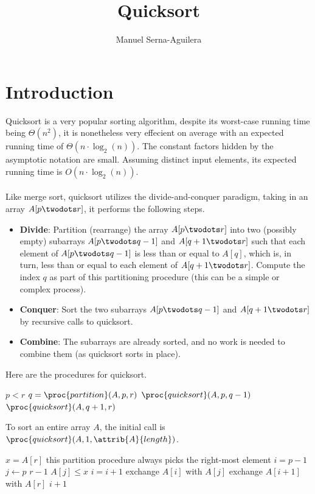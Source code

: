 \documentclass{article}
\title{Quicksort}
\author{Manuel Serna-Aguilera}
\date{}
\begin{document}
\maketitle

\section*{Introduction}
Quicksort is a very popular sorting algorithm, despite its worst-case running time being $\Theta{(n^2)}$, it is nonetheless very effecient on average with an expected running time of $\Theta{(n \cdot \log_2(n))}$. The constant factors hidden by the asymptotic notation are small. Assuming distinct input elements, its expected running time is $O{(n \cdot \log_2(n))}$.
\\ \\
Like merge sort, quicksort utilizes the divide-and-conquer paradigm, taking in an array $A[p \twodots r]$, it performs the following steps.
\begin{itemize}
    \item[] \textbf{Divide}: Partition (rearrange) the array $A[p \twodots r]$ into two (possibly empty) subarrays $A[p \twodots q-1]$ and $A[q+1 \twodots r]$ such that each element of $A[p \twodots q-1]$ is less than or equal to $A[q]$, which is, in turn, less than or equal to each element of $A[q+1 \twodots r]$. Compute the index $q$ as part of this partitioning procedure (this can be a simple or complex process).
    \item[] \textbf{Conquer}: Sort the two subarrays $A[p \twodots q-1]$ and $A[q+1 \twodots r]$ by recursive calls to quicksort.
    \item[] \textbf{Combine}: The subarrays are already sorted, and no work is needed to combine them (as quicksort sorts in place).
\end{itemize}

\newpage

Here are the procedures for quicksort.

\begin{codebox}
\li \If $p < r$
\li \Then
        $q = \proc{partition}(A, p, r)$
\li     $\proc{quicksort}(A, p, q-1)$
\li     $\proc{quicksort}(A, q+1, r)$
    \End
\end{codebox}

To sort an entire array $A$, the initial call is $\proc{quicksort}(A, 1, \attrib{A}{length})$.

\begin{codebox}
\li $x = A[r]$ \Comment this partition procedure always picks the right-most element 
\li $i = p-1$
\li \For $j \gets p$ \To $r-1$
    \Do
\li     \If $A[j] \leq x$
            \Then
\li             $i = i + 1$
\li             exchange $A[i]$ with $A[j]$
            \End
    \End
\li exchange $A[i+1]$ with $A[r]$
\li \Return $i + 1$
\end{codebox}
\end{document}
